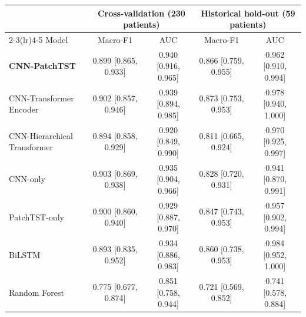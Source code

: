 \begin{tabular}{lcccc}
\toprule
 & \multicolumn{2}{c}{Cross-validation (230 patients)} & \multicolumn{2}{c}{Historical hold-out (59 patients)} \\
\cmidrule(lr){2-3}\cmidrule(lr){4-5}
Model & Macro-F1 & AUC & Macro-F1 & AUC \\
\midrule
\textbf{CNN-PatchTST} & 0.899 [0.865, 0.933] & 0.940 [0.916, 0.965] & 0.866 [0.759, 0.955] & 0.962 [0.910, 0.994] \\
CNN-Transformer Encoder & 0.902 [0.857, 0.946] & 0.939 [0.894, 0.985] & 0.873 [0.753, 0.953] & 0.978 [0.940, 1.000] \\
CNN-Hierarchical Transformer & 0.894 [0.858, 0.929] & 0.920 [0.849, 0.990] & 0.811 [0.665, 0.924] & 0.970 [0.925, 0.997] \\
CNN-only & 0.903 [0.869, 0.938] & 0.935 [0.904, 0.966] & 0.828 [0.720, 0.931] & 0.941 [0.870, 0.991] \\
PatchTST-only & 0.900 [0.860, 0.940] & 0.929 [0.887, 0.970] & 0.847 [0.743, 0.953] & 0.957 [0.902, 0.994] \\
BiLSTM & 0.893 [0.835, 0.952] & 0.934 [0.886, 0.983] & 0.860 [0.738, 0.953] & 0.984 [0.952, 1.000] \\
Random Forest & 0.775 [0.677, 0.874] & 0.851 [0.758, 0.944] & 0.721 [0.569, 0.852] & 0.741 [0.578, 0.884] \\
\bottomrule
\end{tabular}
